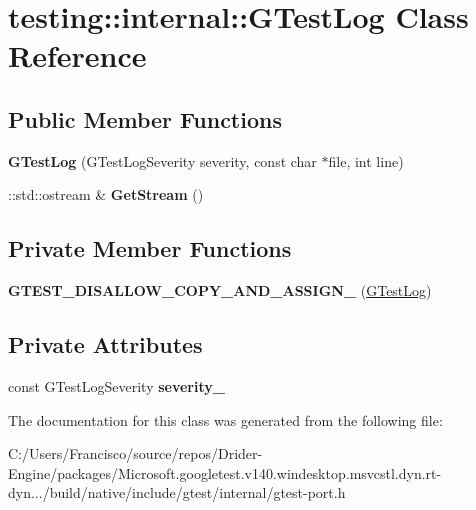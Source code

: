\hypertarget{classtesting_1_1internal_1_1_g_test_log}{}\section{testing\+:\+:internal\+:\+:G\+Test\+Log Class Reference}
\label{classtesting_1_1internal_1_1_g_test_log}
\subsection*{Public Member Functions}
\begin{DoxyCompactItemize}
\item 
\mbox{\label{classtesting_1_1internal_1_1_g_test_log_a364691bf972983a59cfa2891062a64af}} 
{\bfseries G\+Test\+Log} (G\+Test\+Log\+Severity severity, const char $\ast$file, int line)
\item 
\mbox{\label{classtesting_1_1internal_1_1_g_test_log_aebb92e67d98eca69f0347d5121dab27a}} 
\+::std\+::ostream \& {\bfseries Get\+Stream} ()
\end{DoxyCompactItemize}
\subsection*{Private Member Functions}
\begin{DoxyCompactItemize}
\item 
\mbox{\label{classtesting_1_1internal_1_1_g_test_log_ab6032a126d36a80163fdcd406fce3aad}} 
{\bfseries G\+T\+E\+S\+T\+\_\+\+D\+I\+S\+A\+L\+L\+O\+W\+\_\+\+C\+O\+P\+Y\+\_\+\+A\+N\+D\+\_\+\+A\+S\+S\+I\+G\+N\+\_\+} (\hyperlink{classtesting_1_1internal_1_1_g_test_log}{G\+Test\+Log})
\end{DoxyCompactItemize}
\subsection*{Private Attributes}
\begin{DoxyCompactItemize}
\item 
\mbox{\label{classtesting_1_1internal_1_1_g_test_log_ad8f75f5845900d0d2fd3cbb048a861be}} 
const G\+Test\+Log\+Severity {\bfseries severity\+\_\+}
\end{DoxyCompactItemize}


The documentation for this class was generated from the following file\+:\begin{DoxyCompactItemize}
\item 
C\+:/\+Users/\+Francisco/source/repos/\+Drider-\/\+Engine/packages/\+Microsoft.\+googletest.\+v140.\+windesktop.\+msvcstl.\+dyn.\+rt-\/dyn.../build/native/include/gtest/internal/gtest-\/port.\+h\end{DoxyCompactItemize}
